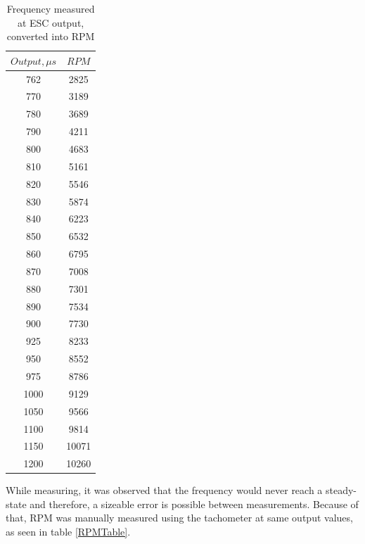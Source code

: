 \begin{table}[H]
\centering
\begin{tabular}{|c|c|}
\hline
$Output,\mu s$ 	& $RPM$ \\ \hline
762 			& 2825  \\ \hline
770				& 3189	\\ \hline
780				& 3689	\\ \hline
790				& 4211	\\ \hline
800 			& 4683  \\ \hline
810 			& 5161	\\ \hline
820 			& 5546  \\ \hline
830				& 5874 	\\ \hline
840				& 6223	\\ \hline
850 			& 6532	\\ \hline
860 			& 6795	\\ \hline
870 			& 7008	\\ \hline
880 			& 7301	\\ \hline
890 			& 7534	\\ \hline
900 			& 7730	\\ \hline
925 			& 8233	\\ \hline
950 			& 8552	\\ \hline
975 			& 8786	\\ \hline
1000 			& 9129	\\ \hline
1050 			& 9566	\\ \hline
1100 			& 9814	\\ \hline
1150 			& 10071	\\ \hline
1200			& 10260	\\ \hline
\end{tabular}
\caption{Frequency measured at ESC output, converted into RPM}
\label{FreqTable}
\end{table}

While measuring, it was observed that the frequency would never reach a steady-state and therefore, a sizeable error is possible between measurements. Because of that, RPM was manually measured using the tachometer at same output values, as seen in table \ref{RPMTable}.

